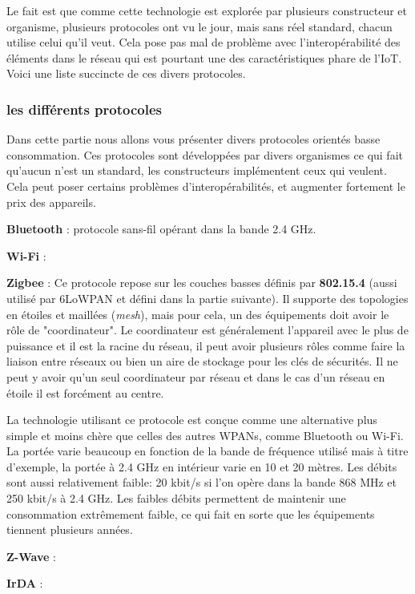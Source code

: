Le fait est que comme cette technologie est explorée par plusieurs constructeur et organisme, plusieurs protocoles ont vu le jour, mais sans réel standard, chacun utilise celui qu'il veut. Cela pose pas mal de problème avec l'interopérabilité des éléments dans le réseau qui est pourtant une des caractéristiques phare de l'IoT. Voici une liste succincte de ces divers protocoles.

\subsubsection{les différents protocoles}

Dans cette partie nous allons vous présenter divers protocoles orientés basse consommation. Ces protocoles sont développées par divers organismes ce qui fait qu'aucun n'est un standard, les constructeurs implémentent ceux qui veulent. Cela peut poser certains problèmes d'interopérabilités, et augmenter fortement le prix des appareils.

\textbf{Bluetooth} : protocole sans-fil opérant dans la bande 2.4 GHz. 

\textbf{Wi-Fi} :

\textbf{Zigbee} : Ce protocole repose sur les couches basses définis par \textbf{802.15.4} (aussi utilisé par 6LoWPAN et défini dans la partie suivante). Il supporte des topologies en étoiles et maillées (\textit{mesh}), mais pour cela, un des équipements doit avoir le rôle de "coordinateur". Le coordinateur est généralement l'appareil avec le plus de puissance et il est la racine du réseau, il peut avoir plusieurs rôles comme faire la liaison entre réseaux ou bien un aire de stockage pour les clés de sécurités. Il ne peut y avoir qu'un seul coordinateur par réseau et dans le cas d'un réseau en étoile il est forcément au centre.

La technologie utilisant ce protocole est conçue comme une alternative plus simple et moins chère que celles des autres WPANs, comme Bluetooth ou Wi-Fi. La portée varie beaucoup en fonction de la bande de fréquence utilisé mais à titre d'exemple, la portée à 2.4 GHz en intérieur varie en 10 et 20 mètres. Les débits sont aussi relativement faible: 20 kbit/s si l'on opère dans la bande 868 MHz et 250 kbit/s à 2.4 GHz. Les faibles débits permettent de maintenir une consommation extrêmement faible, ce qui fait en sorte que les équipements tiennent plusieurs années.

\textbf{Z-Wave} :

\textbf{IrDA} :